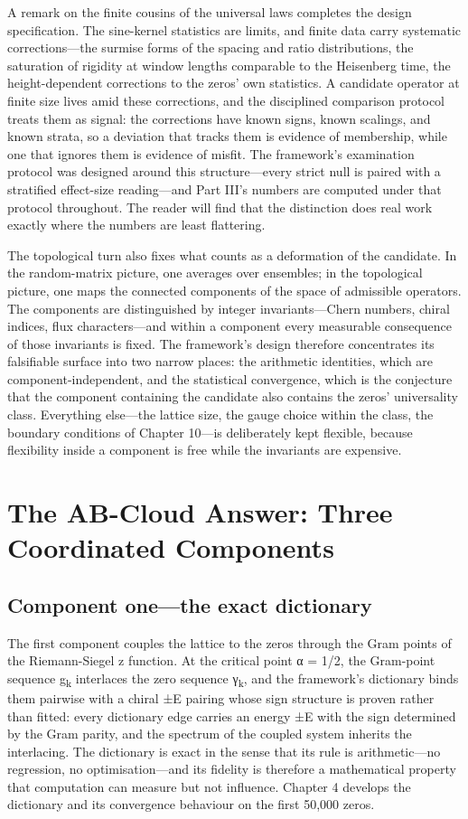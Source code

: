 \documentclass[10pt]{article}
\begin{document}
A remark on the finite cousins of the universal laws completes the design specification. The sine-kernel statistics are limits, and finite data carry systematic corrections---the surmise forms of the spacing and ratio distributions, the saturation of rigidity at window lengths comparable to the Heisenberg time, the height-dependent corrections to the zeros' own statistics. A candidate operator at finite size lives amid these corrections, and the disciplined comparison protocol treats them as signal: the corrections have known signs, known scalings, and known strata, so a deviation that tracks them is evidence of membership, while one that ignores them is evidence of misfit. The framework's examination protocol was designed around this structure---every strict null is paired with a stratified effect-size reading---and Part III's numbers are computed under that protocol throughout. The reader will find that the distinction does real work exactly where the numbers are least flattering.

The topological turn also fixes what counts as a deformation of the candidate. In the random-matrix picture, one averages over ensembles; in the topological picture, one maps the connected components of the space of admissible operators. The components are distinguished by integer invariants---Chern numbers, chiral indices, flux characters---and within a component every measurable consequence of those invariants is fixed. The framework's design therefore concentrates its falsifiable surface into two narrow places: the arithmetic identities, which are component-independent, and the statistical convergence, which is the conjecture that the component containing the candidate also contains the zeros' universality class. Everything else---the lattice size, the gauge choice within the class, the boundary conditions of Chapter 10---is deliberately kept flexible, because flexibility inside a component is free while the invariants are expensive.

\section{The AB-Cloud Answer: Three Coordinated Components}\label{sec:ch3}
\subsection{Component one---the exact dictionary}\label{sec:31}
The first component couples the lattice to the zeros through the Gram points of the Riemann-Siegel z function. At the critical point α = 1/2, the Gram-point sequence g\textsubscript{k} interlaces the zero sequence γ\textsubscript{k}, and the framework's dictionary binds them pairwise with a chiral ±E pairing whose sign structure is proven rather than fitted: every dictionary edge carries an energy ±E with the sign determined by the Gram parity, and the spectrum of the coupled system inherits the interlacing. The dictionary is exact in the sense that its rule is arithmetic---no regression, no optimisation---and its fidelity is therefore a mathematical property that computation can measure but not influence. Chapter 4 develops the dictionary and its convergence behaviour on the first 50,000 zeros.
\end{document}
